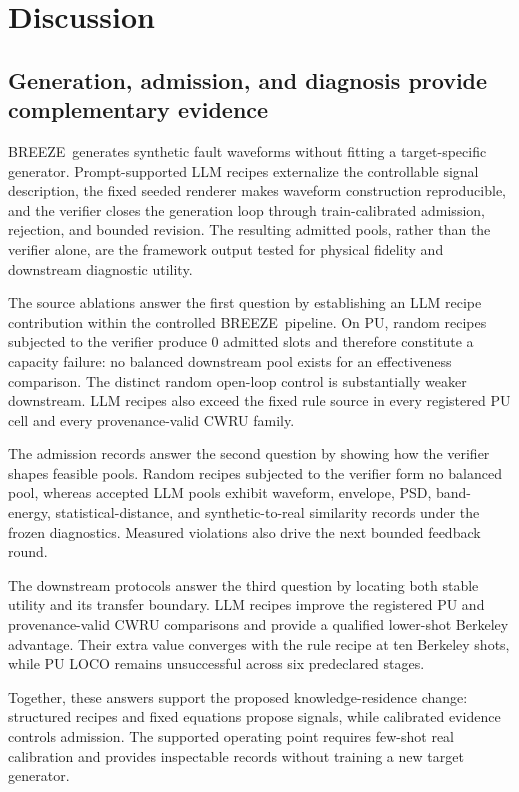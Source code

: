 \documentclass[a4paper,fleqn]{cas-sc}
\newcommand{\breeze}{BREEZE}
\begin{document}
\section{Discussion}
\label{sec:discussion}

\subsection{Generation, admission, and diagnosis provide complementary evidence}

\breeze\ generates synthetic fault waveforms without fitting a target-specific
generator. Prompt-supported LLM recipes externalize the controllable signal
description, the fixed seeded renderer makes waveform construction
reproducible, and the verifier closes the generation loop through
train-calibrated admission, rejection, and bounded revision. The resulting
admitted pools, rather than the verifier alone, are the framework output tested
for physical fidelity and downstream diagnostic utility.

The source ablations answer the first question by establishing an LLM recipe
contribution within the controlled \breeze\ pipeline. On PU, random recipes
subjected to the verifier produce 0 admitted slots and therefore constitute a
capacity failure: no balanced downstream pool exists for an effectiveness
comparison. The distinct random open-loop control is substantially weaker
downstream. LLM recipes also exceed the fixed rule source in every registered
PU cell and every provenance-valid CWRU family.

The admission records answer the second question by showing how the verifier
shapes feasible pools. Random recipes subjected to the verifier form no
balanced pool, whereas accepted LLM pools exhibit waveform, envelope, PSD,
band-energy, statistical-distance, and synthetic-to-real similarity records
under the frozen diagnostics. Measured violations also drive the next bounded
feedback round.

The downstream protocols answer the third question by locating both stable
utility and its transfer boundary. LLM recipes improve the registered PU and
provenance-valid CWRU comparisons and provide a qualified lower-shot Berkeley
advantage. Their extra value converges with the rule recipe at ten Berkeley
shots, while PU LOCO remains unsuccessful across six predeclared stages.

Together, these answers support the proposed knowledge-residence change:
structured recipes and fixed equations propose signals, while calibrated
evidence controls admission. The supported operating point requires few-shot
real calibration and provides inspectable records without training a new target
generator.
\end{document}
